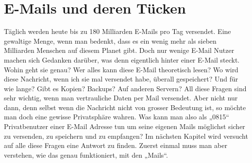 \newpage
\section{E-Mails und deren Tücken}
Täglich werden heute bis zu 180 Milliarden E-Mails pro Tag versendet. Eine gewaltige Menge, wenn man bedenkt, dass es ein wenig mehr als sieben Milliarden Menschen auf diesem Planet gibt.
Doch nur wenige E-Mail Nutzer machen sich Gedanken darüber, was denn eigentlich hinter einer E-Mail steckt. Wohin geht sie genau? Wer alles kann diese E-Mail theoretisch lesen? Wo wird diese Nachricht, wenn ich sie mal versendet habe, überall gespeichert? Und für wie lange? Gibt es Kopien? Backups? Auf anderen Servern?
All diese Fragen sind sehr wichtig, wenn man vertrauliche Daten per Mail versendet. Aber nicht nur dann, denn selbst wenn die Nachricht nicht von grosser Bedeutung ist, so möchte man doch eine gewisse Privatsphäre wahren.
Was kann man also als „0815“ Privatbenutzer einer E-Mail Adresse tun um seine eigenen Mails möglichst sicher zu versenden, zu speichern und  zu empfangen?
Im nächsten Kapitel wird versucht auf alle diese Fragen eine Antwort zu finden. Zuerst einmal muss man aber verstehen, wie das genau funktioniert, mit den „Mails“.

